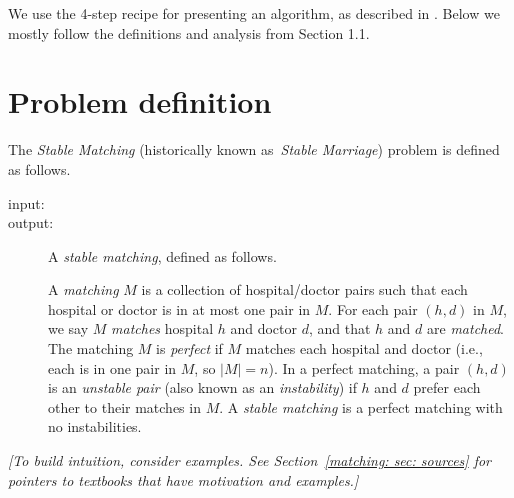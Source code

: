 \documentclass[11pt]{article}
\begin{document}

\newpage

We use the 4-step recipe for presenting an algorithm, as described in .
Below we mostly follow the definitions and analysis from \KT Section 1.1.

\section{Problem definition}\label{matching: sec: problem definition}

The \emph{Stable Matching} (historically known as~\emph{Stable Marriage}) problem is defined as follows.
\begin{description}
\item[input:]

\item[output:]
  A \emph{stable matching}, defined as follows.

  A \emph{matching} $M$ is a collection of hospital/doctor pairs
  such that each hospital or doctor is in at most one pair in $M$.
  For each pair $(h,d)$ in $M$, we say $M$ \emph{matches} hospital $h$ and doctor $d$,
  and that $h$ and $d$ are \emph{matched}.
  The matching $M$ is \emph{perfect} if $M$ matches each hospital and doctor
  (i.e., each is in one pair in $M$, so $|M| = n$).
  In a perfect matching, a pair $(h,d)$ is an \emph{unstable pair} (also known as an \emph{instability})
  if $h$ and $d$ prefer each other to their matches in $M$.
  A \emph{stable matching} is a perfect matching with no instabilities.
\end{description}

\emph{[To build intuition, consider examples.
    See Section~\ref{matching: sec: sources} for pointers to textbooks that have motivation and examples.]}
\end{document}
